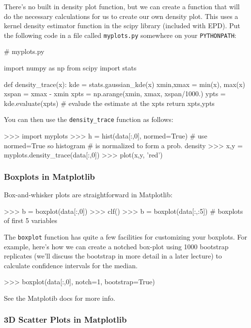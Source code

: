 There's no built in density plot function, but we can create a function
that will do the necessary calculations for us to create our own density
plot. This uses a kernel density estimator function in the scipy library
(included with EPD). Put the following code in a file called
\lstinline!myplots.py! somewhere on your \lstinline!PYTHONPATH!:
%
\begin{python}
# myplots.py

import numpy as np
from scipy import stats

def density_trace(x):
    kde = stats.gaussian_kde(x)
    xmin,xmax = min(x), max(x)
    xspan = xmax - xmin
    xpts = np.arange(xmin, xmax, xspan/1000.)
    ypts = kde.evaluate(xpts) # evalude the estimate at the xpts
    return xpts,ypts
\end{python}

You can then use the \lstinline!density_trace! function as follows:
%
\begin{python}
>>> import myplots
>>> h = hist(data[:,0], normed=True) # use normed=True so histogram 
                           # is normalized to form a prob. density
>>> x,y = myplots.density_trace(data[:,0])
>>> plot(x,y, 'red')    
\end{python}

\subsubsection{Boxplots in Matplotlib}

Box-and-whisker plots are straightforward in Matplotlib:
%
\begin{python}
>>> b = boxplot(data[:,0])
>>> clf()
>>> b = boxplot(data[:,:5]) # boxplots of first 5 variables
\end{python}
%
The \lstinline!boxplot! function has quite a few facilities for
customizing your boxplots. For example, here's how we can create a
notched box-plot using 1000 bootstrap replicates (we'll discuss the
bootstrap in more detail in a later lecture) to calculate confidence
intervals for the median.
%
\begin{python}
>>> boxplot(data[:,0], notch=1, bootstrap=True)    
\end{python}
See the Matplotib docs for more info.

\subsubsection{3D Scatter Plots in Matplotlib}

